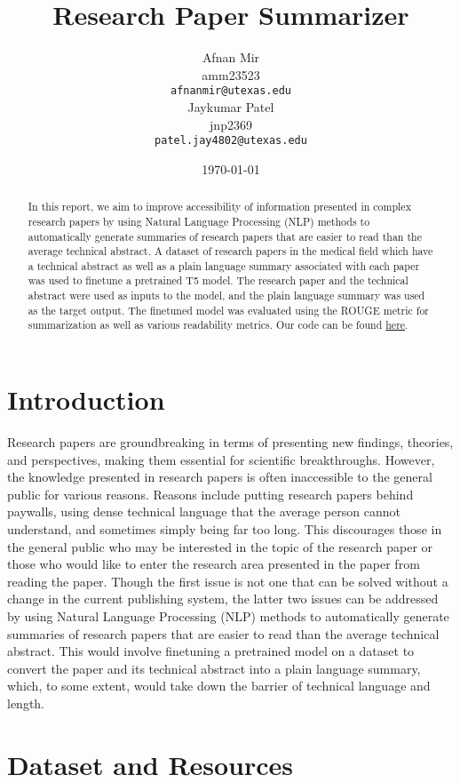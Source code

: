 \documentclass[11pt,a4paper]{article}
\title{Research Paper Summarizer}
\author{Afnan Mir \\
  amm23523 \\
  {\tt afnanmir@utexas.edu} \\\And
  Jaykumar Patel \\
  jnp2369 \\
  {\tt patel.jay4802@utexas.edu} \\}
\date{\today}
\begin{document}
\maketitle
\begin{abstract}
  In this report, we aim to improve accessibility of information presented in complex research papers by using Natural Language Processing (NLP) methods to automatically generate summaries of research papers that are easier to read than the average technical abstract. A dataset of research papers in the medical field which have a technical abstract as well as a plain language summary associated with each paper was used to finetune a pretrained T5 model. The research paper and the technical abstract were used as inputs to the model, and the plain language summary was used as the target output. The finetuned model was evaluated using the ROUGE metric for summarization as well as various readability metrics. Our code can be found \href{https://github.com/afnanmmir/Research-Paper-Summarizer}{here}.
\end{abstract}

\section{Introduction}

\indent \indent Research papers are groundbreaking in terms of presenting new findings, theories, and perspectives, making them essential for scientific breakthroughs. However, the knowledge presented in research papers is often inaccessible to the general public for various reasons. Reasons include putting research papers behind paywalls, using dense technical language that the average person cannot understand, and sometimes simply being far too long. This discourages those in the general public who may be interested in the topic of the research paper or those who would like to enter the research area presented in the paper from reading the paper. Though the first issue is not one that can be solved without a change in the current publishing system, the latter two issues can be addressed by using Natural Language Processing (NLP) methods to automatically generate summaries of research papers that are easier to read than the average technical abstract. This would involve finetuning a pretrained model on a dataset to convert the paper and its technical abstract into a plain language summary, which, to some extent, would take down the barrier of technical language and length.
\section{Dataset and Resources}
\end{document}
